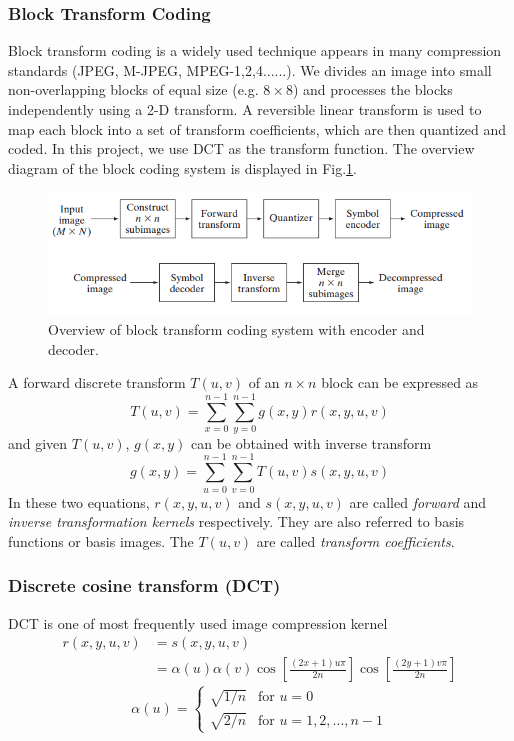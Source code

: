 \subsubsection{Block Transform Coding}
Block transform coding is a widely used technique appears in many compression standards (JPEG, M-JPEG, MPEG-1,2,4......). We divides an image into small non-overlapping blocks of equal size (e.g. $8\times 8$) and processes the blocks independently using a 2-D transform. A reversible linear transform is used to map each block into a set of transform coefficients, which are then quantized and coded. In this project, we use DCT as the transform function. The overview diagram of the block coding system is displayed in Fig.\ref{fig:blocksys}. 
\begin{figure}[h!]
	\centering	
	\includegraphics[width=0.7\linewidth]{myfigure/p7/block_system.png}
	\caption{Overview of block transform coding system with encoder and decoder.}
	\label{fig:blocksys}
\end{figure}
A forward discrete transform $T(u,v)$ of an $n\times n$ block can be expressed as \begin{equation} T(u,v)=\sum_{x=0}^{n-1}\sum_{y=0}^{n-1}g(x,y)r(x,y,u,v) \end{equation} and given $T(u,v)$, $g(x,y)$ can be obtained with inverse transform \begin{equation} g(x,y)=\sum_{u=0}^{n-1}\sum_{v=0}^{n-1}T(u,v)s(x,y,u,v) \end{equation} In these two equations, $r(x,y,u,v)$ and $s(x,y,u,v)$ are called \emph{forward} and \emph{inverse transformation kernels} respectively. They are also referred to basis functions or basis images. The $T(u,v)$ are called \emph{transform coefficients}.
\subsubsection{Discrete cosine transform (DCT)}
DCT is one of most frequently used image compression kernel
\begin{equation}\begin{aligned} r(x,y,u,v)&=s(x,y,u,v)\\ 
&=\alpha(u)\alpha(v)\cos\left[ \frac{(2x+1)u\pi}{2n}\right] \cos\left[ \frac{(2y+1)v\pi}{2n} \right]
\end{aligned}\end{equation} 
\begin{equation} \alpha(u) = \left\{ \begin{array}{rcl}
\sqrt{1/n} & \text{for } u=0 \\
\sqrt{2/n} & \text{for } u=1,2,...,n-1
\end{array} \right. \end{equation}
